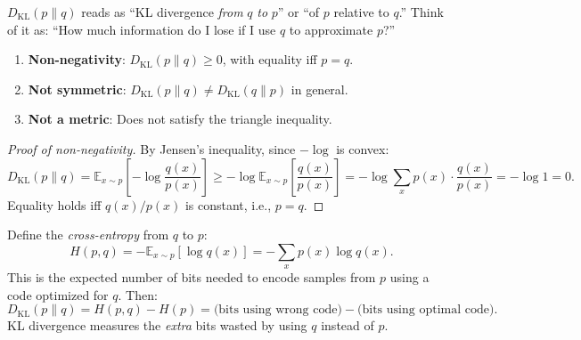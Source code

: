 \begin{remark}
    $D_{\mathrm{KL}}(p \| q)$ reads as ``KL divergence \emph{from} $q$ \emph{to} $p$'' or ``of $p$ relative to $q$.'' Think of it as: ``How much information do I lose if I use $q$ to approximate $p$?''
\end{remark}

\begin{proposition}
    \begin{enumerate}
        \item \textbf{Non-negativity}: $D_{\mathrm{KL}}(p \| q) \geq 0$, with equality iff $p = q$.
        \item \textbf{Not symmetric}: $D_{\mathrm{KL}}(p \| q) \neq D_{\mathrm{KL}}(q \| p)$ in general.
        \item \textbf{Not a metric}: Does not satisfy the triangle inequality.
    \end{enumerate}
\end{proposition}

\begin{proof}[Proof of non-negativity]
    By Jensen's inequality, since $-\log$ is convex:
    \[
        D_{\mathrm{KL}}(p \| q) = \mathbb{E}_{x \sim p}\left[ -\log \frac{q(x)}{p(x)} \right] \geq -\log \mathbb{E}_{x \sim p}\left[ \frac{q(x)}{p(x)} \right] = -\log \sum_x p(x) \cdot \frac{q(x)}{p(x)} = -\log 1 = 0.
    \]
    Equality holds iff $q(x)/p(x)$ is constant, i.e., $p = q$.
\end{proof}

\begin{remark}
    Define the \emph{cross-entropy} from $q$ to $p$:
    \[
        H(p, q) = -\mathbb{E}_{x \sim p}[\log q(x)] = -\sum_x p(x) \log q(x).
    \]
    This is the expected number of bits needed to encode samples from $p$ using a code optimized for $q$. Then:
    \[
        D_{\mathrm{KL}}(p \| q) = H(p, q) - H(p) = \text{(bits using wrong code)} - \text{(bits using optimal code)}.
    \]
    KL divergence measures the \emph{extra} bits wasted by using $q$ instead of $p$.
\end{remark}

